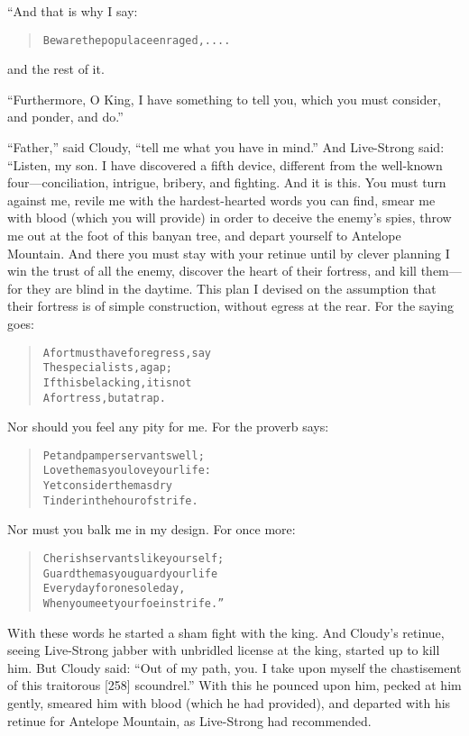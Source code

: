 \documentclass[article, twoside, 14pt]{memoir}
\renewenvironment{verbatim}{%
\begin{quote}%
\vskip -10pt%
\begin{alltt}\normalfont\large}{\end{alltt}%
\end{quote}%
\vskip -10pt
} %
\begin{document}
“And that is why I say:

\begin{verbatim}
Beware the populace enraged, ....
\end{verbatim}
and the rest of it.

``Furthermore, O King, I have something to tell you, which you must consider, and ponder, and do.''

``Father,'' said Cloudy, ``tell me what you have in mind.'' And
Live-Strong said: “Listen, my son. I have discovered a fifth
device, different from the well-known four---conciliation,
intrigue, bribery, and fighting. And it is this. You must turn
against me, revile me with the hardest-hearted words you can find,
smear me with blood (which you will provide) in order to deceive
the enemy's spies, throw me out at the foot of this banyan tree,
and depart yourself to Antelope Mountain. And there you must stay
with your retinue until by clever planning I win the trust of all
the enemy, discover the heart of their fortress, and kill
them---for they are blind in the daytime. This plan I devised on
the assumption that their fortress is of simple construction,
without egress at the rear. For the saying goes:

\begin{verbatim}
A fort must have for egress, say
    The specialists, a gap;
If this be lacking, it is not
    A fortress, but a trap.
\end{verbatim}
Nor should you feel any pity for me. For the proverb says:

\begin{verbatim}
Pet and pamper servants well;
    Love them as you love your life:
Yet consider them as dry
    Tinder in the hour of strife.
\end{verbatim}
Nor must you balk me in my design. For once more:

\begin{verbatim}
Cherish servants like yourself;
    Guard them as you guard your life
Every day for one sole day,
    When you meet your foe in strife.”
\end{verbatim}
With these words he started a sham fight with the king. And
Cloudy's retinue, seeing Live-Strong jabber with unbridled license
at the king, started up to kill him. But Cloudy said:
``Out of my path, you. I take upon myself the chastisement of this traitorous [258] scoundrel.''
With this he pounced upon him, pecked at him gently, smeared him
with blood (which he had provided), and departed with his retinue
for Antelope Mountain, as Live-Strong had recommended.
\end{document}
